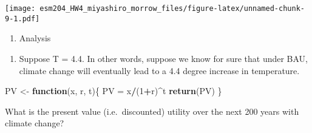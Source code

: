 \documentclass[]{article}
\newenvironment{Shaded}{\begin{snugshade}}{\end{snugshade}}
\newcommand{\CommentTok}[1]{\textcolor[rgb]{0.56,0.35,0.01}{\textit{#1}}}
\newcommand{\ControlFlowTok}[1]{\textcolor[rgb]{0.13,0.29,0.53}{\textbf{#1}}}
\newcommand{\DataTypeTok}[1]{\textcolor[rgb]{0.13,0.29,0.53}{#1}}
\newcommand{\DecValTok}[1]{\textcolor[rgb]{0.00,0.00,0.81}{#1}}
\newcommand{\FloatTok}[1]{\textcolor[rgb]{0.00,0.00,0.81}{#1}}
\newcommand{\KeywordTok}[1]{\textcolor[rgb]{0.13,0.29,0.53}{\textbf{#1}}}
\newcommand{\NormalTok}[1]{#1}
\newcommand{\OperatorTok}[1]{\textcolor[rgb]{0.81,0.36,0.00}{\textbf{#1}}}
\newcommand{\StringTok}[1]{\textcolor[rgb]{0.31,0.60,0.02}{#1}}
\providecommand{\tightlist}{%
  \setlength{\itemsep}{0pt}\setlength{\parskip}{0pt}}
\begin{document}
\texttt{[image: esm204\_HW4\_miyashiro\_morrow\_files/figure-latex/unnamed-chunk-9-1.pdf]}

\begin{enumerate}
\def\labelenumi{\arabic{enumi}.}
\setcounter{enumi}{1}
\tightlist
\item
  Analysis
\end{enumerate}

\begin{enumerate}
\def\labelenumi{(\alph{enumi})}
\tightlist
\item
  Suppose T = 4.4. In other words, suppose we know for sure that under
  BAU, climate change will eventually lead to a 4.4 degree increase in
  temperature.
\end{enumerate}

\begin{Shaded}
\begin{Highlighting}[]
\NormalTok{PV <-}\StringTok{ }\ControlFlowTok{function}\NormalTok{(x, r, t)\{}
\NormalTok{  PV =}\StringTok{ }\NormalTok{x}\OperatorTok{/}\NormalTok{(}\DecValTok{1}\OperatorTok{+}\NormalTok{r)}\OperatorTok{^}\NormalTok{t}
  \KeywordTok{return}\NormalTok{(PV)}
\NormalTok{\}}
\end{Highlighting}
\end{Shaded}

What is the present value (i.e.~discounted) utility over the next 200
years with climate change?

\begin{Shaded}
\end{Shaded}
\end{document}
